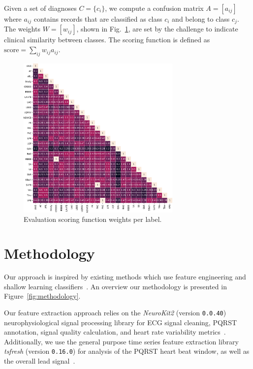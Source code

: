\documentclass[twocolumn]{cinc}
\begin{document}
Given a set of diagnoses $C = \{c_i\}$, we compute a confusion matrix $A = [a_{ij}]$ where $a_{ij}$ contains records that are classified as class $c_i$ and belong to class $c_j$.
The weights $W = [w_{ij}]$, shown in Fig.~\ref{fig:dataset_labeldx}, are set by the challenge to indicate clinical similarity between classes.
The scoring function is defined as $\text{score} = \sum_{ij} w_{ij} a_{ij}$.

\begin{figure}[ht]
  \centering
  \includegraphics[width=8cm]{fig/label_weights.png}
  \caption{Evaluation scoring function weights per label.}
  \label{fig:dataset_labeldx}
\end{figure}

\section{Methodology}

Our approach is inspired by existing methods which use feature engineering and shallow learning classifiers~\cite{tziakouri_identification_2017, goodwin_classification_2017}.
An overview our methodology is presented in Figure~\ref{fig:methodology}.

Our feature extraction approach relies on the \emph{NeuroKit2} (version \texttt{0.0.40}) neurophysiological signal processing library for ECG signal cleaning, PQRST annotation, signal quality calculation, and heart rate variability metrics~\cite{neurokit2}.
Additionally, we use the general purpose time series feature extraction library \emph{tsfresh} (version \texttt{0.16.0}) for analysis of the PQRST heart beat window, as well as the overall lead signal~\cite{CHRIST201872}.
\end{document}
